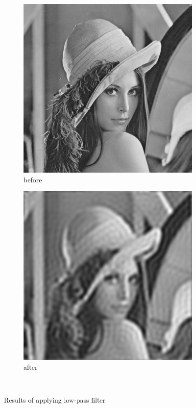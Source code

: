 \documentclass[12pt]{article}
\begin{document}
\begin{figure}[H]\centering
    \begin{subfigure}[t]{\subfiguresize}\centering
        \includegraphics[width=\textwidth]{img/lena.png}
        \caption{before}
    \end{subfigure}
    \hspace{2em}
    \begin{subfigure}[t]{\subfiguresize}\centering
        \includegraphics[width=\textwidth]{img/lena_lowpass.png}
        \caption{after}
    \end{subfigure}\\[1em]
    \caption{Results of applying low-pass filter}
\end{figure}   
\end{document}
